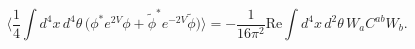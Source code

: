 \begin{equation}\label{Konishi_Anomaly}
\Big\langle \frac{1}{4}\int d^4x\,d^4\theta\,\Big(\phi^* e^{2V}\phi
+ \tilde\phi^* e^{-2V}\tilde\phi\Big)\Big\rangle
= - \frac{1}{16\pi^2} \mbox{Re}\int d^4x\,d^2\theta\,W_a C^{ab} W_b.
\end{equation}

